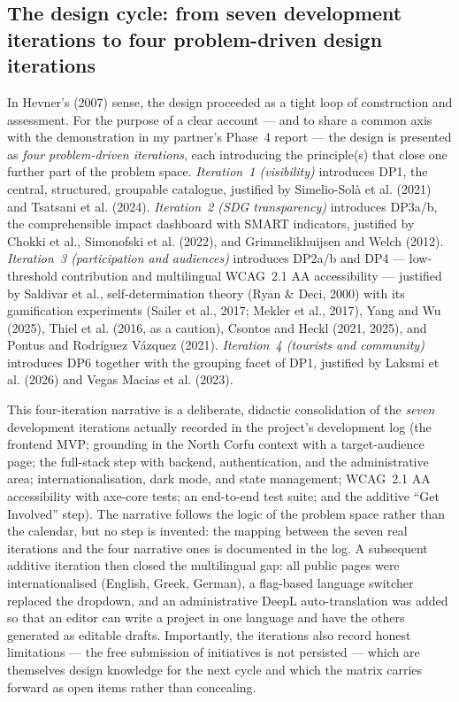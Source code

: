 \documentclass[11pt,a4paper]{article}
\begin{document}
\subsection{The design cycle: from seven development iterations to four problem-driven design iterations}

In Hevner's (2007) sense, the design proceeded as a tight loop of construction and assessment. For the purpose of a clear account --- and to share a common axis with the demonstration in my partner's Phase~4 report --- the design is presented as \emph{four problem-driven iterations}, each introducing the principle(s) that close one further part of the problem space. \emph{Iteration~1 (visibility)} introduces DP1, the central, structured, groupable catalogue, justified by Simelio-Sol\`a et al. (2021) and Tsatsani et al. (2024). \emph{Iteration~2 (SDG transparency)} introduces DP3a/b, the comprehensible impact dashboard with SMART indicators, justified by Chokki et al., Simonofski et al. (2022), and Grimmelikhuijsen and Welch (2012). \emph{Iteration~3 (participation and audiences)} introduces DP2a/b and DP4 --- low-threshold contribution and multilingual WCAG~2.1 AA accessibility --- justified by Saldivar et al., self-determination theory (Ryan \& Deci, 2000) with its gamification experiments (Sailer et al., 2017; Mekler et al., 2017), Yang and Wu (2025), Thiel et al. (2016, as a caution), Csontos and Heckl (2021, 2025), and Pontus and Rodr\'iguez V\'azquez (2021). \emph{Iteration~4 (tourists and community)} introduces DP6 together with the grouping facet of DP1, justified by Laksmi et al. (2026) and Vegas Macias et al. (2023).

This four-iteration narrative is a deliberate, didactic consolidation of the \emph{seven} development iterations actually recorded in the project's development log (the frontend MVP; grounding in the North Corfu context with a target-audience page; the full-stack step with backend, authentication, and the administrative area; internationalisation, dark mode, and state management; WCAG~2.1 AA accessibility with axe-core tests; an end-to-end test suite; and the additive ``Get Involved'' step). The narrative follows the logic of the problem space rather than the calendar, but no step is invented: the mapping between the seven real iterations and the four narrative ones is documented in the log. A subsequent additive iteration then closed the multilingual gap: all public pages were internationalised (English, Greek, German), a flag-based language switcher replaced the dropdown, and an administrative DeepL auto-translation was added so that an editor can write a project in one language and have the others generated as editable drafts. Importantly, the iterations also record honest limitations --- the free submission of initiatives is not persisted --- which are themselves design knowledge for the next cycle and which the matrix carries forward as open items rather than concealing.
\end{document}
